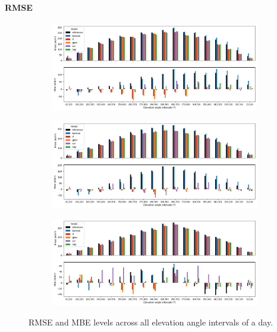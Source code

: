 \paragraph{RMSE}
\indent
\begin{figure}[htb!]
    \centering
    \begin{subfigure}{\columnwidth}
        \centering
        \includegraphics[width=0.6\columnwidth]{figures/first_study/rmse_mbe_site1.png}
    \end{subfigure}
\medskip
    \begin{subfigure}{\columnwidth}
        \centering
        \includegraphics[width=0.6\columnwidth]{figures/first_study/rmse_mbe_site3.png}
    \end{subfigure}
\medskip
    \begin{subfigure}{\columnwidth}
        \centering
        \includegraphics[width=0.6\columnwidth]{figures/first_study/rmse_mbe_site4.png}
    \end{subfigure}
    \caption[]{RMSE and MBE levels across all elevation angle intervals of a day.}
\end{figure}

\newpage

